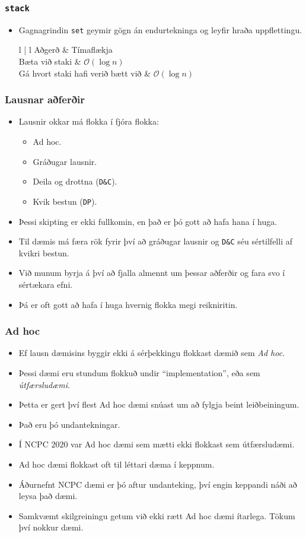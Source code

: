 \documentclass{beamer}
\newcommand\env[2]
{
	\begin{#1}
	#2
	\end{#1}
}
\begin{document}
\env{frame}
{
	\frametitle{\texttt{stack}}
	\env{itemize}
	{
		\item<1-> Gagnagrindin \texttt{set} geymir gögn án endurtekninga og leyfir hraða uppflettingu.
		\env{tabular}
		{
			{l | l}
			Aðgerð & Tímaflækja\\
			\hline
			Bæta við staki & $\mathcal{O}(\log n)$\\
			Gá hvort staki hafi verið bætt við  & $\mathcal{O}(\log n)$\\
		}
	}
}

\env{frame}
{
	\frametitle{Lausnar aðferðir}
	\env{itemize}
	{
		\item<1-> Lausnir okkar má flokka í fjóra flokka:
		\env{itemize}
		{
			\item<2-> Ad hoc.
			\item<3-> Gráðugar lausnir.
			\item<4-> Deila og drottna (\texttt{D\&C}).
			\item<5-> Kvik bestun (\texttt{DP}).
		}
		\item<6-> Þessi skipting er ekki fullkomin, en það er þó gott að hafa hana í huga.
		\item<7-> Til dæmis má færa rök fyrir því að gráðugar lausnir og \texttt{D\&C} séu sértilfelli af kvikri bestun.
		\item<8-> Við munum byrja á því að fjalla almennt um þessar aðferðir og fara svo í sértækara efni.
		\item<9-> Þá er oft gott að hafa í huga hvernig flokka megi reikniritin.
	}
}

\env{frame}
{
	\frametitle{Ad hoc}
	\env{itemize}
	{
		\item<1-> Ef lausn dæmisins byggir ekki á sérþekkingu flokkast dæmið sem \emph{Ad hoc}.
		\item<2-> Þessi dæmi eru stundum flokkuð undir ``implementation'', eða sem \emph{útfærsludæmi}.
		\item<3-> Þetta er gert því flest Ad hoc dæmi snúast um að fylgja beint leiðbeiningum.
		\item<4-> Það eru þó undantekningar.
		\item<5-> Í NCPC $2020$ var Ad hoc dæmi sem mætti ekki flokkast sem útfærsludæmi.
		\item<6-> Ad hoc dæmi flokkast oft til léttari dæma í keppnum.
		\item<7-> Áðurnefnt NCPC dæmi er þó aftur undanteking, því engin keppandi náði að leysa það dæmi.
		\item<8-> Samkvæmt skilgreiningu getum við ekki rætt Ad hoc dæmi ítarlega. Tökum því nokkur dæmi.
	}
}
\end{document}
